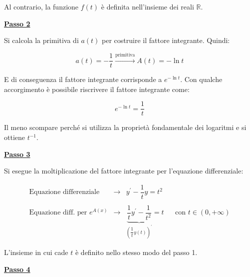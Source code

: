 \documentclass[a4paper]{article}
\begin{document}
	\noindent
	Al contrario, la funzione $f\left(t\right)$ è definita nell'insieme dei reali $\mathbb{R}$.\newline
	
	\noindent
	\textcolor{Red3}{\textbf{\underline{Passo 2}}}\newline
	
	\noindent
	Si calcola la primitiva di $a\left(t\right)$ per costruire il fattore integrante. Quindi:
	
	\begin{equation*}
		a\left(t\right) = - \dfrac{1}{t} \xrightarrow{\text{primitiva}} A\left(t\right) = -\ln t
	\end{equation*}

	\noindent
	E di conseguenza il fattore integrante corrisponde a $e^{-\ln t}$. Con qualche accorgimento è possibile riscrivere il fattore integrante come:
	
	\begin{equation*}
		e^{-\ln t} = \dfrac{1}{t}
	\end{equation*}

	\noindent
	Il meno scompare perché si utilizza la proprietà fondamentale dei logaritmi e si ottiene $t^{-1}$.
	
	\newpage
	
	\noindent
	\textcolor{Red3}{\textbf{\underline{Passo 3}}}\newline
	
	\noindent
	Si esegue la moltiplicazione del fattore integrante per l'equazione differenziale:
	
	\begin{equation*}
		\begin{array}{lllll}
			\text{Equazione differenziale}					& \longrightarrow & y^{'} - \dfrac{1}{t} y = t^{2} && \\
			&&&& \\
			\text{Equazione diff. per } e^{A\left(x\right)}	& \longrightarrow & \underbrace{\dfrac{1}{t}y^{'} - \dfrac{1}{t^{2}}}_{\left(\dfrac{1}{t}y\left(t\right)\right)^{'}} = t && \text{con } t \in \left(0, +\infty\right)
		\end{array}
	\end{equation*}

	\noindent
	L'insieme in cui cade $t$ è definito nello stesso modo del passo 1.\newline

	\noindent
	\textcolor{Red3}{\textbf{\underline{Passo 4}}}\newline
	
\end{document}
